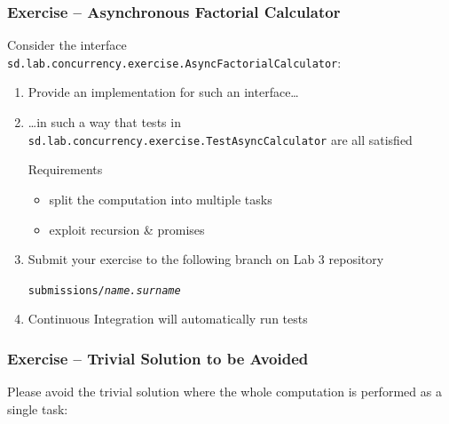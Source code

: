 \documentclass{beamer}\mode<presentation>{\usetheme{AMSCesenaPurpleAndGold}}
\begin{document}
\begin{frame}[c, allowframebreaks]
\frametitle{Exercise \currentExercise{} -- Asynchronous Factorial Calculator}

	Consider the interface \texttt{sd.lab.concurrency.exercise.\alert{AsyncFactorialCalculator}}:
	\bigskip
	
	\bigskip
	\begin{enumerate}
		\item Provide an implementation for such an interface\ldots
		
		\bigskip
		
		\item \ldots in such a way that tests in \texttt{sd.lab\allowbreak{}.concurrency\allowbreak{}.exercise\allowbreak{}.\alert{TestAsyncCalculator}} are all satisfied
		
		\framebreak
		
		\begin{block}{Requirements}
			\begin{itemize}
				\item split the computation into multiple tasks
				\item exploit recursion \& promises
			\end{itemize}
		\end{block}
		
		\bigskip

		\item Submit your exercise to the following branch on Lab 3 repository
		\begin{center}
			\texttt{submissions/\textit{name.surname}}
		\end{center}
	
		\bigskip
	
		\item Continuous Integration will automatically run tests
	\end{enumerate}
	
\end{frame}

\begin{frame}[c, allowframebreaks]
	\frametitle{Exercise \currentExercise{} -- Trivial Solution to be \textbf{Avoided}}
	
	Please \alert{avoid} the trivial solution where the whole computation is performed as a single task:
	

\end{frame}
\end{document}
